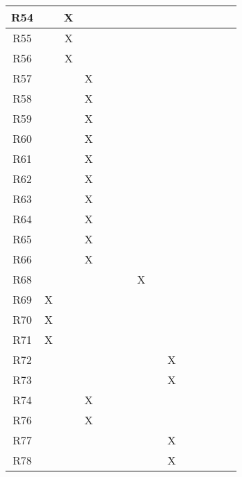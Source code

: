 \begin{table}[]
\begin{tabular}{|c|c|c|c|c|c|c|c|c|c|c|c|c|c|c|}
R54 &    & X  &    &    &    &    &    &    &    &     &     &     &     &     \\ \hline
R55 &    & X  &    &    &    &    &    &    &    &     &     &     &     &     \\ \hline
R56 &    & X  &    &    &    &    &    &    &    &     &     &     &     &     \\ \hline
R57 &    &    & X  &    &    &    &    &    &    &     &     &     &     &     \\ \hline
R58 &    &    & X  &    &    &    &    &    &    &     &     &     &     &     \\ \hline
R59 &    &    & X  &    &    &    &    &    &    &     &     &     &     &     \\ \hline
R60 &    &    & X  &    &    &    &    &    &    &     &     &     &     &     \\ \hline
R61 &    &    & X  &    &    &    &    &    &    &     &     &     &     &     \\ \hline
R62 &    &    & X  &    &    &    &    &    &    &     &     &     &     &     \\ \hline
R63 &    &    & X  &    &    &    &    &    &    &     &     &     &     &     \\ \hline
R64 &    &    & X  &    &    &    &    &    &    &     &     &     &     &     \\ \hline
R65 &    &    & X  &    &    &    &    &    &    &     &     &     &     &     \\ \hline
R66 &    &    & X  &    &    &    &    &    &    &     &     &     &     &     \\ \hline
R68 &    &    &    &    &    &    & X  &    &    &     &     &     &     &     \\ \hline
R69 & X  &    &    &    &    &    &    &    &    &     &     &     &     &     \\ \hline
R70 & X  &    &    &    &    &    &    &    &    &     &     &     &     &     \\ \hline
R71 & X  &    &    &    &    &    &    &    &    &     &     &     &     &     \\ \hline
R72 &    &    &    &    &    &    &    &    & X  &     &     &     &     &     \\ \hline
R73 &    &    &    &    &    &    &    &    & X  &     &     &     &     &     \\ \hline
R74 &    &    & X  &    &    &    &    &    &    &     &     &     &     &     \\ \hline
R76 &    &    & X  &    &    &    &    &    &    &     &     &     &     &     \\ \hline
R77 &    &    &    &    &    &    &    &    & X  &     &     &     &     &     \\ \hline
R78 &    &    &    &    &    &    &    &    & X  &     &     &     &     &     \\ \hline
\end{tabular}
\end{table}